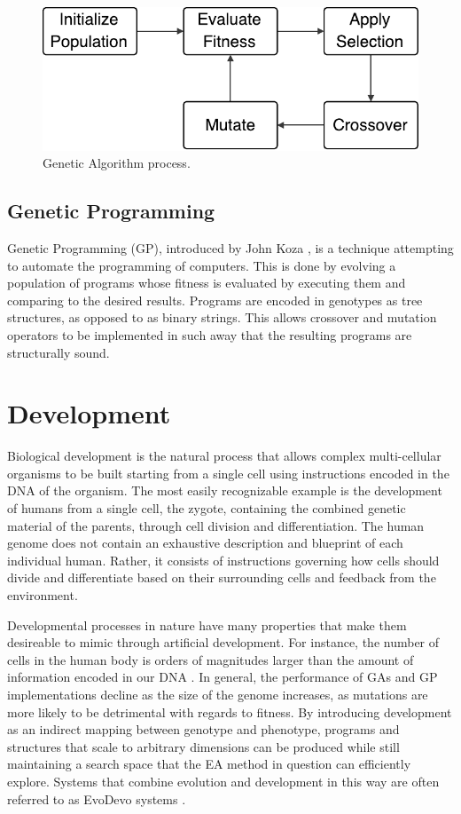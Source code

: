 \begin{figure}[ht]
  \centering
  \includegraphics[width=0.5\linewidth]{fig/ga}
  \caption{Genetic Algorithm process.}
  \label{fig:ga}
\end{figure}

\subsection{Genetic Programming}

Genetic Programming (GP), introduced by John Koza \cite{Koza:1992:GPP:138936},
is a technique attempting to automate the programming of computers. This is done
by evolving a population of programs whose fitness is evaluated by executing
them and comparing to the desired results. Programs are encoded in genotypes as
tree structures, as opposed to as binary strings. This allows crossover and
mutation operators to be implemented in such away that the resulting programs
are structurally sound.


\section{Development}
\label{sec:development}

Biological development is the natural process that allows complex multi-cellular
organisms to be built starting from a single cell using instructions encoded in
the DNA of the organism. The most easily recognizable example is the development
of humans from a single cell, the zygote, containing the combined genetic
material of the parents, through cell division and differentiation. The human
genome does not contain an exhaustive description and blueprint of each
individual human. Rather, it consists of instructions governing how cells should
divide and differentiate based on their surrounding cells and feedback from the
environment.

Developmental processes in nature have many properties that make them desireable
to mimic through artificial development. For instance, the number of cells in
the human body is orders of magnitudes larger than the amount of information
encoded in our DNA \cite{Bianconi2013}. In general, the performance of GAs and
GP implementations decline as the size of the genome increases, as mutations are
more likely to be detrimental with regards to fitness. By introducing
development as an indirect mapping between genotype and phenotype, programs and
structures that scale to arbitrary dimensions can be produced while still
maintaining a search space that the EA method in question can efficiently
explore. Systems that combine evolution and development in this way are often
referred to as EvoDevo systems \cite{Hall2003}.

